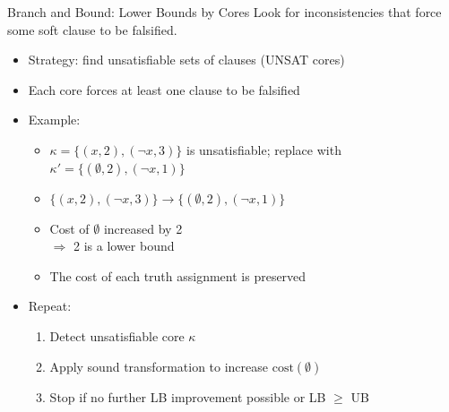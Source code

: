 \documentclass[t,english]{sdqbeamer}
\begin{document}
\begin{frame}{Branch and Bound: Lower Bounds by Cores}
\vspace{-1em}
Look for inconsistencies that force some soft clause to be falsified.\\[1em]
\begin{itemize}\itemsep1em
	\item Strategy: find unsatisfiable sets of clauses (UNSAT cores)
	\item Each core forces at least one clause to be falsified
	\item Example:
	\begin{itemize}\itemsep1em
		\item $\kappa = \{(x,2), (\lnot x, 3)\}$ is unsatisfiable; replace with $\kappa' = \{(\emptyset, 2), (\lnot x, 1)\}$
		\item $\{(x,2), (\lnot x,3)\} \rightarrow \{(\emptyset,2), (\lnot x,1)\}$
		\item Cost of $\emptyset$ increased by 2\\
			$\Rightarrow$ 2 is a lower bound
		\item The cost of each truth assignment is preserved
	\end{itemize}
	\item Repeat:
	\begin{enumerate}\itemsep1ex
		\item Detect unsatisfiable core $\kappa$
		\item Apply sound transformation to increase $\text{cost}(\emptyset)$
		\item Stop if no further LB improvement possible or LB $\geq$ UB
	\end{enumerate}
\end{itemize}
\end{frame}
\end{document}

